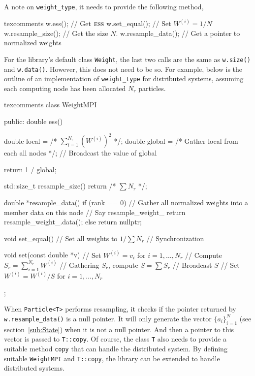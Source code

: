 A note on \verb|weight_type|, it needs to provide the following method,
\begin{cppcode*}{texcomments}
  w.ess();           // Get $\text{\normalfont\textsc{ess}}$
  w.set_equal();     // Set $W^{(i)} = 1/N$
  w.resample_size(); // Get the size $N$.
  w.resample_data(); // Get a pointer to normalized weights
\end{cppcode*}
For the library's default class \verb|Weight|, the last two calls are the same
as \verb|w.size()| and \verb|w.data()|. However, this does not need to be so.
For example, below is the outline of an implementation of \verb|weight_type|
for distributed systems, assuming each computing node has been allocated $N_r$
particles.
\begin{cppcode*}{texcomments}
  class WeightMPI
  {
      public:
      double ess()
      {
          double local = /* $\sum_{i=1}^{N_r}(W^{(i)})^2$ */;
          double global = /* Gather local from each all nodes */;
          // Broadcast the value of global

          return 1 / global;
      }

      std::size_t resample_size() { return /* $\sum N_r$ */; }

      double *resample_data()
      {
          if (rank == 0) {
              // Gather all normalized weights into a member data on this node
              // Say resample\_weight\_
              return resample_weight_.data();
          } else {
              return nullptr;
          }
      }

      void set_equal()
      {
          // Set all weights to $1 / \sum N_r$
          // Synchronization
      }

      void set(const double *v)
      {
          // Set $W^{(i)} = v_i$ for $i = 1,\dots,N_r$
          // Compute $S_r = \sum_{i=1}^{N_r} W^{(i)}$
          // Gathering $S_r$, compute $S = \sum S_r$
          // Broadcast $S$
          // Set $W^{(i)} = W^{(i)} / S$ for $i = 1,\dots,N_r$
      }
  };
\end{cppcode*}
When \verb|Particle<T>| performs resampling, it checks if the pointer returned
by \verb|w.resample_data()| is a null pointer. It will only generate the vector
$\{a_i\}_{i=1}^N$ (see section~\ref{sub:State}) when it is not a null pointer.
And then a pointer to this vector is passed to \verb|T::copy|. Of course, the
class \verb|T| also needs to provide a suitable method \verb|copy| that can
handle the distributed system. By defining suitable \verb|WeightMPI| and
\verb|T::copy|, the library can be extended to handle distributed systems.

